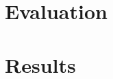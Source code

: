 \documentclass[a4paper, 10pt]{article}
\begin{document}
\section{Evaluation}


\section{Results}
\end{document}
